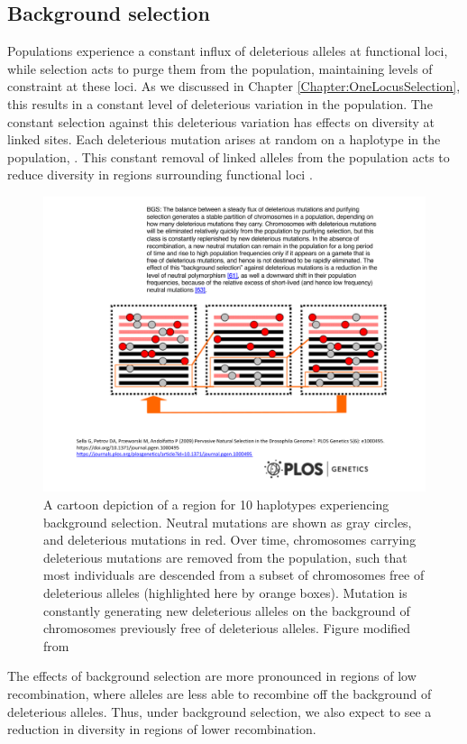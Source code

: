 \subsection{Background selection}

Populations experience a constant influx of
deleterious alleles at functional loci, while selection acts to purge
them from the population, maintaining levels of constraint at these loci. As
we discussed in Chapter \ref{Chapter:OneLocusSelection}, this results
in a constant level of deleterious variation in the population. The
constant selection against this deleterious variation has effects on diversity at linked
sites. Each deleterious mutation arises at random on a haplotype in the
population, . This constant removal of linked alleles from the population
acts to reduce diversity in regions surrounding functional loci \citep{Hudson:95b,Nordborg:96}. 

\begin{figure}
\begin{center}
\includegraphics[width=0.75 \textwidth]{figures/Hitchhiking/BGS_cartoon.pdf}
\end{center}
\caption{A cartoon depiction of a region for 10 haplotypes
  experiencing background selection. Neutral mutations are shown as
  gray circles, and deleterious mutations in red. Over time,
  chromosomes carrying deleterious mutations are removed from the
  population, such that most individuals are descended from a subset of
  chromosomes free of deleterious alleles (highlighted here by orange boxes). Mutation is constantly generating new deleterious alleles on
  the background of chromosomes previously free of deleterious
  alleles. Figure modified from \citet{sella2009pervasive}} \label{fig:BGS_cartoon}
\end{figure}
The effects of background selection are more pronounced in regions of low recombination, where
 alleles are less able to recombine off the background of deleterious
alleles. Thus, under background selection, we also expect to see a
reduction in diversity in regions of lower recombination. 

